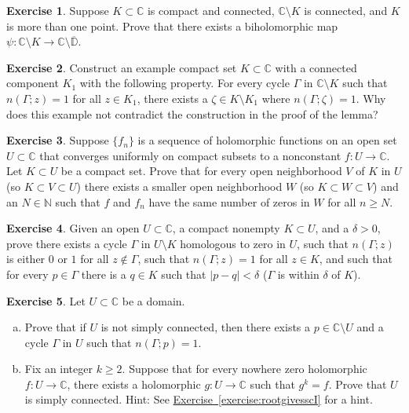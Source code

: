 \documentclass[12pt,openany]{book}
\newcommand{\sabs}[1]{\lvert {#1} \rvert}
\newcommand{\C}{{\mathbb{C}}}
\newcommand{\N}{{\mathbb{N}}}
\newcommand{\D}{{\mathbb{D}}}
\theoremstyle{plain}
\theoremstyle{remark}
\theoremstyle{definition}
\newenvironment{exbox}{%
    \def\FrameCommand{\vrule width 1pt \relax\hspace{10pt}}%
    \MakeFramed{\advance\hsize-\width\FrameRestore}%
}{%
    \endMakeFramed
}
\newenvironment{exparts}{%
    \leavevmode\begin{enumerate}[a),noitemsep,topsep=0pt,parsep=0pt,partopsep=0pt]
}{%
    \end{enumerate}
}
\theoremstyle{exercise}
\newtheorem{exercise}{Exercise}[section]
\theoremstyle{example}
\newcommand{\exerciseref}[1]{\hyperref[#1]{Exercise~\ref*{#1}}}
\begin{document}
\begin{exbox}
\begin{exercise}
Suppose $K \subset \C$ is compact and connected, $\C \setminus K$ is
connected, and $K$ is more than one point.
Prove that there exists a biholomorphic
map $\psi \colon \C \setminus K \to \C \setminus \overline{\D}$.
\end{exercise}

\begin{exercise}
Construct an example compact set $K \subset \C$ with a connected component $K_1$
with the following property.
For every cycle $\Gamma$ in $\C \setminus K$ such that $n(\Gamma;z)=1$ for
all $z \in K_1$,
there exists a $\zeta \in K \setminus K_1$ where $n(\Gamma;\zeta)=1$.
Why does this example not contradict the construction in the proof of the lemma?
\end{exercise}

\begin{exercise}
Suppose $\{ f_n \}$ is a sequence of holomorphic functions on an open set
$U \subset \C$ that converges uniformly on compact subsets to
a nonconstant
$f \colon U \to \C$.  Let $K \subset U$ be a compact set.  Prove that
for every open neighborhood $V$ of $K$ in $U$ (so $K \subset V \subset U$) there exists
a smaller open neighborhood $W$ (so $K \subset W \subset V$) and an $N \in \N$
such that $f$ and $f_n$ have the same number of zeros in $W$ for all
$n \geq N$.
\end{exercise}

\begin{exercise}
Given an open $U \subset \C$, a compact nonempty $K \subset U$, and a $\delta > 0$,
prove there
exists a cycle $\Gamma$ in $U \setminus K$ homologous to zero in $U$,
such that $n(\Gamma;z)$ is either $0$ or $1$ for all $z \notin \Gamma$,
such that
$n(\Gamma;z) = 1$ for all $z \in K$, 
and such that for every $p \in \Gamma$ there is a $q \in K$ such that
$\sabs{p-q} < \delta$ ($\Gamma$ is within $\delta$ of $K$).
\end{exercise}

\begin{exercise}\label{exercise:rootgivesscII}
Let $U \subset \C$ be a domain.
\begin{exparts}
\item
Prove that if $U$ is not simply connected, then there exists a $p \in \C
\setminus U$ and a cycle $\Gamma$ in $U$ such that $n(\Gamma;p)=1$.
\item
Fix an integer $k \geq 2$.
Suppose that for every nowhere zero holomorphic $f \colon U \to \C$,
there exists a holomorphic $g \colon U \to \C$ such that $g^k = f$.
Prove that $U$ is simply connected.
Hint: See \exerciseref{exercise:rootgivesscI} for a hint.
\end{exparts}
\end{exercise}
\end{exbox}
\end{document}
